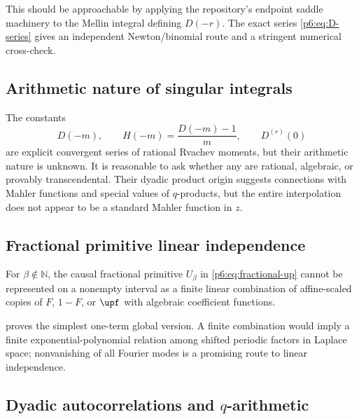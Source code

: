 \documentclass[11pt,oneside]{article}
\theoremstyle{definition}
\theoremstyle{remark}
\newcommand{\N}{\mathbb N}
\newcommand{\1}{\mathbf 1}
\begin{document}
This should be approachable by applying the repository's endpoint saddle machinery to
the Mellin integral defining \(D(-r)\).  The exact series \eqref{p6:eq:D-series} gives an
independent Newton/binomial route and a stringent numerical cross-check.

\subsection{Arithmetic nature of singular integrals}

The constants
\begin{equation}
 D(-m),\qquad H(-m)=\frac{D(-m)-1}{m},\qquad
 D^{(r)}(0)                                                \label{p6:eq:arithmetic-constants}
\end{equation}
are explicit convergent series of rational Rvachev moments, but their arithmetic nature
is unknown.  It is reasonable to ask whether any are rational, algebraic, or provably
transcendental.  Their dyadic product origin suggests connections with Mahler functions
and special values of \(q\)-products, but the entire interpolation does not appear to be
a standard Mahler function in \(z\).

\subsection{Fractional primitive linear independence}

\begin{conjecture}
For \(\beta\notin\N\), the causal fractional primitive \(U_\beta\) in
\eqref{p6:eq:fractional-up} cannot be represented on a nonempty interval as a finite linear
combination of affine-scaled copies of \(F\), \(1-F\), or \(\upf\) with algebraic
coefficient functions.
\end{conjecture}

 proves the simplest one-term global version.  A finite
combination would imply a finite exponential-polynomial relation among shifted periodic
factors in Laplace space; nonvanishing of all Fourier modes is a promising route to
linear independence.

\subsection{Dyadic autocorrelations and \(q\)-arithmetic}
\end{document}
